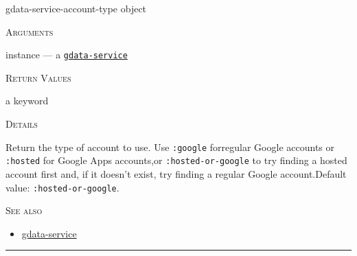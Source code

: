 \documentclass[a4paper]{report}
\begin{document}
    \label{cl-gdata-service__fun__gdata-service-account-type}
    \begin{defun}[Function]
    gdata-service-account-type object


    
    \bigskip
    \textsc{Arguments}

instance
	--- a \hyperref[cl-gdata-service__class__gdata-service]{\texttt{gdata-service}}
  




    
    \bigskip
    \textsc{Return Values}

a keyword


	
    \bigskip
    \textsc{Details}

              Return the type of account to use. Use \texttt{:google} forregular Google accounts or \texttt{:hosted} for Google Apps accounts,or \texttt{:hosted-or-google} to try finding a hosted account first and,
if it doesn't exist, try finding a regular Google account.Default value: \texttt{:hosted-or-google}.


      
    \bigskip
    \textsc{See also}


	
    \begin{itemize}
    
	  
    \item
    \hyperref[cl-gdata-service__class__gdata-service]{gdata-service}
    
	
    \end{itemize}
  
      


    
    \end{defun}
  
  

    \rule{\linewidth}{0.1mm}
    
\end{document}
